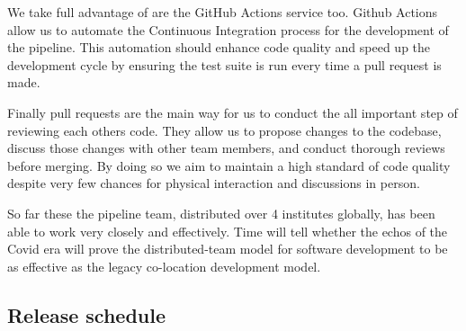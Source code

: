 \documentclass[a4paper]{spie}  %
\begin{document}
We take full advantage of are the GitHub Actions service too. 
Github Actions allow us to automate the Continuous Integration process for the development of the pipeline. 
This automation should enhance code quality and speed up the development cycle by ensuring the test suite is run every time a pull request is made. 

Finally pull requests are the main way for us to conduct the all important step of reviewing each others code. 
They allow us to propose changes to the codebase, discuss those changes with other team members, and conduct thorough reviews before merging. 
By doing so we aim to maintain a high standard of code quality despite very few chances for physical interaction and discussions in person.

So far these the pipeline team, distributed over 4 institutes globally, has been able to work very closely and effectively. 
Time will tell whether the echos of the Covid era will prove the distributed-team model for software development to be as effective as the legacy co-location development model.


\subsection{Release schedule}
\label{subsec:imp_schedule}
\end{document}
